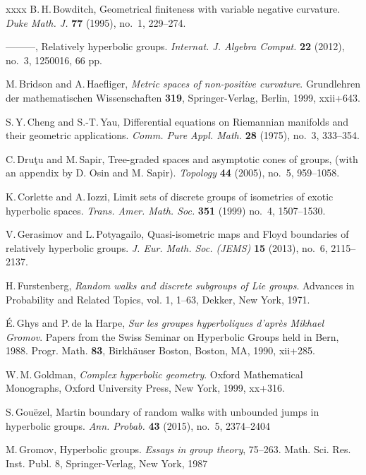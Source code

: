 \documentclass[12pt,a4paper]{amsart}
\numberwithin{equation}{section}
\theoremstyle{definition}
\begin{document}
\begin{thebibliography}{xxxx}
B.\,H.\,Bowditch,
Geometrical finiteness with variable negative curvature.
\emph{Duke Math. J.} \textbf{77} (1995), no.~1, 229--274.

---{}---{}---,
Relatively hyperbolic groups.
\emph{Internat. J. Algebra Comput.} \textbf{22} (2012), no.~3, 1250016, 66 pp.

M.\,Bridson and A.\,Haefliger,
\emph{Metric spaces of non-positive curvature}.
Grundlehren der mathematischen Wissenschaften {\bf 319}, Springer-Verlag, Berlin, 1999, xxii+643.

S.\,Y.\,Cheng and S.-T.\,Yau,
Differential equations on {R}iemannian manifolds and their geometric applications.
\emph{Comm. Pure Appl. Math.} {\bf 28} (1975), no.~3, 333--354.

C.\,Dru\c{t}u and M.\,Sapir,
Tree-graded spaces and asymptotic cones of groups,
(with an appendix by D. Osin and M. Sapir).
\emph{Topology} {\bf 44} (2005), no.~5, 959--1058.
  
K.\,Corlette and A.\,Iozzi,
Limit sets of discrete groups of isometries of exotic hyperbolic spaces.
\emph{Trans. Amer. Math. Soc.} {\bf 351} (1999) no.~4, 1507--1530.

V.\,Gerasimov and L.\,Potyagailo,
Quasi-isometric maps and Floyd boundaries of relatively hyperbolic groups.
\emph{J. Eur. Math. Soc. (JEMS)}  {\bf 15} (2013), no.~6, 2115--2137.

H.\,Furstenberg,
\emph{Random walks and discrete subgroups of {L}ie groups}.
Advances in {P}robability and {R}elated {T}opics, vol. 1, 1--63,
Dekker, New York, 1971.

\'E.\,Ghys and P.\,de la Harpe,
\emph{Sur les groupes hyperboliques d'apr\`es {M}ikhael {G}romov}.
Papers from the Swiss Seminar on Hyperbolic Groups held in Bern, 1988.
Progr. Math. {\bf 83}, Birkh\"auser Boston, Boston, MA, 1990, xii+285.

W.\,M.\,Goldman,
\emph{Complex hyperbolic geometry}.
Oxford Mathematical Monographs,
Oxford University Press, New York, 1999, xx+316.  

S.\,Gou\"ezel, 
Martin boundary of random walks with unbounded jumps in hyperbolic groups.
\emph{Ann. Probab.} {\bf 43} (2015), no.~5, 2374--2404

M.\,Gromov,
Hyperbolic groups.
\emph{ Essays in group theory}, 75–263.
Math. Sci. Res. Inst. Publ. 8, Springer-Verlag, New York, 1987


\end{thebibliography}
\end{document}
